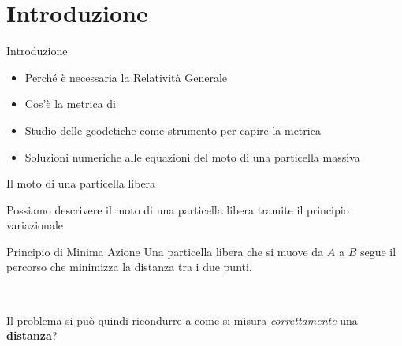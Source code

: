 
\section{Introduzione}


\begin{frame}{Introduzione}
    \begin{itemize}
        \item Perché è necessaria la Relatività Generale
        \item Cos'è la metrica di \Sh
        \item Studio delle geodetiche come strumento per capire la metrica
        \item Soluzioni numeriche alle equazioni del moto di una particella
            massiva
    \end{itemize}
\end{frame}


\begin{frame}{Il moto di una particella libera}

    Possiamo descrivere il moto di una particella libera tramite il principio
    variazionale \\

    \begin{block}{Principio di Minima Azione}
        {Una particella libera che si muove da $A$ a $B$ segue il percorso che
        minimizza la distanza tra i due punti.}
    \end{block}

    ~

    Il problema si può quindi ricondurre a come si misura \textit{correttamente}
    una \textbf{distanza}?

\end{frame}


